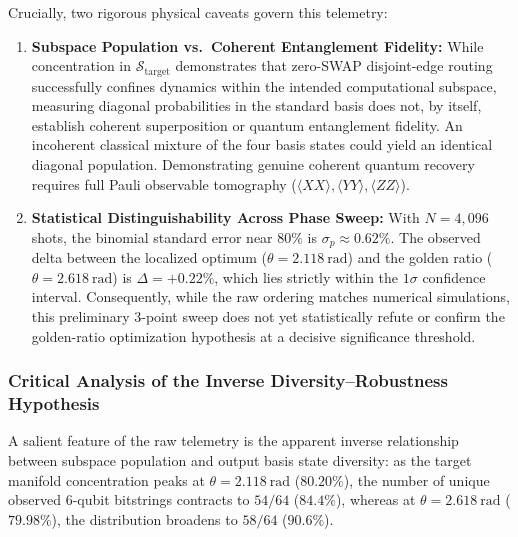 \documentclass[aps,preprint,superscriptaddress,longbibliography]{revtex4-2}
\begin{document}
Crucially, two rigorous physical caveats govern this telemetry:
\begin{enumerate}
\item \textbf{Subspace Population vs.\ Coherent Entanglement Fidelity:} While concentration in $\mathcal{S}_{\mathrm{target}}$ demonstrates that zero-SWAP disjoint-edge routing successfully confines dynamics within the intended computational subspace, measuring diagonal probabilities in the standard basis does not, by itself, establish coherent superposition or quantum entanglement fidelity. An incoherent classical mixture of the four basis states could yield an identical diagonal population. Demonstrating genuine coherent quantum recovery requires full Pauli observable tomography ($\langle XX \rangle, \langle YY \rangle, \langle ZZ \rangle$).
\item \textbf{Statistical Distinguishability Across Phase Sweep:} With $N = 4{,}096$ shots, the binomial standard error near $80\%$ is $\sigma_p \approx 0.62\%$. The observed delta between the localized optimum ($\theta = \SI{2.118}{\radian}$) and the golden ratio ($\theta = \SI{2.618}{\radian}$) is $\Delta = +0.22\%$, which lies strictly within the $1\sigma$ confidence interval. Consequently, while the raw ordering matches numerical simulations, this preliminary 3-point sweep does not yet statistically refute or confirm the golden-ratio optimization hypothesis at a decisive significance threshold.
\end{enumerate}

\subsubsection{Critical Analysis of the Inverse Diversity--Robustness Hypothesis}
\label{sec:diversity_robustness}

A salient feature of the raw telemetry is the apparent inverse relationship between subspace population and output basis state diversity: as the target manifold concentration peaks at $\theta = \SI{2.118}{\radian}$ ($80.20\%$), the number of unique observed 6-qubit bitstrings contracts to $54/64$ ($84.4\%$), whereas at $\theta = \SI{2.618}{\radian}$ ($79.98\%$), the distribution broadens to $58/64$ ($90.6\%$). 
\end{document}
